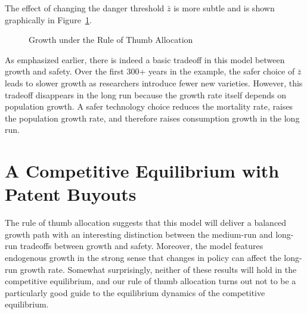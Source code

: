 \documentclass[12pt,twoside]{article}
\newcommand{\cn}[1]{\citet*{#1}}
\begin{document}
The effect of changing the danger threshold $\bar{z}$ is more subtle
and is shown graphically in Figure~\ref{fig:rule}.
\begin{figure}[tp]
\caption{Growth under the Rule of Thumb Allocation}
\label{fig:rule}
\end{figure} 
As emphasized earlier, there is indeed a basic tradeoff in this model
between growth and safety.  Over the first 300+ years in the example,
the safer choice of $\bar{z}$ leads to slower growth as researchers
introduce fewer new varieties.  However, this tradeoff disappears in the
long run because the growth rate itself depends on population growth.  A
safer technology choice reduces the mortality rate, raises the
population growth rate, and therefore raises consumption growth in the
long run.



\section{A Competitive Equilibrium with Patent Buyouts}

The rule of thumb allocation suggests that this model will deliver a
balanced growth path with an interesting distinction between the
medium-run and long-run tradeoffs between growth and safety.  Moreover,
the model features endogenous growth in the strong sense that changes in
policy can affect the long-run growth rate.  Somewhat surprisingly,
neither of these results will hold in the competitive equilibrium, and
our rule of thumb allocation turns out not to be a particularly good
guide to the equilibrium dynamics of the competitive equilibrium.
\end{document}
